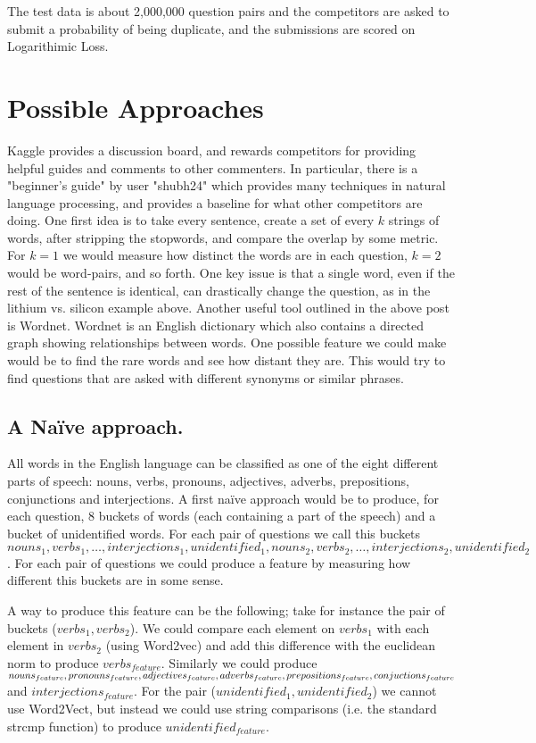 \documentclass[11pt]{article}
\begin{document}
The test data is about 2,000,000 question pairs and the competitors are asked to submit a probability of being duplicate, and the submissions are scored on Logarithimic Loss.

\section{Possible Approaches}\label{approaches}
Kaggle provides a discussion board, and rewards competitors for providing helpful guides and comments to other commenters. In particular, there is a "beginner's guide" by user "shubh24" \cite{shubh} which provides many techniques in natural language processing, and provides a baseline for what other competitors are doing. One first idea is to take every sentence, create a set of every $k$ strings of words, after stripping the stopwords, and compare the overlap by some metric. For $k=1$ we would measure how distinct the words are in each question, $k=2$ would be word-pairs, and so forth. One key issue is that a single word, even if the rest of the sentence is identical, can drastically change the question, as in the lithium vs. silicon example above. Another useful tool outlined in the above post is Wordnet. Wordnet is an English dictionary which also contains a directed graph showing relationships between words. One possible feature we could make would be to find the rare words and see how distant they are. This would try to find questions that are asked with different synonyms or similar phrases.



\subsection{A Na\"ive approach.}

All words in the English language can be classified as one of the eight different parts of speech: nouns, verbs, pronouns, adjectives, adverbs, prepositions, conjunctions and interjections. A first na\"ive approach would be to produce, for each question, 8 buckets of words (each containing a part of the speech) and a bucket of unidentified words. For each pair of questions we call this buckets $nouns_1, verbs_1, \ldots, interjections_1, unidentified_1, nouns_2, verbs_2, \ldots, interjections_2, unidentified_2$. For each pair of questions we could produce a feature by measuring how different this buckets are in some sense.

A way to produce this feature can be the following; take for instance the pair of buckets ($verbs_1, verbs_2$). We could compare each element on $verbs_1$ with each element in $verbs_2$ (using Word2vec) and add this difference with the euclidean norm to produce $verbs_{feature}$. Similarly we could produce $nouns_{feature}, pronouns_{feature}, adjectives_{feature}, adverbs_{feature}, prepositions_{feature}, \newline conjuctions_{feature}$ and $interjections_{feature}$. For the pair ($unidentified_1, unidentified_2$) we cannot use Word2Vect, but instead we could use string comparisons (i.e. the standard strcmp function) to produce $unidentified_{feature}$.
\end{document}
